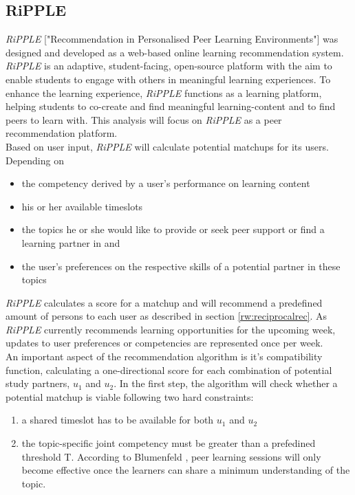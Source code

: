 \documentclass[conference]{IEEEtran}
\begin{document}
\subsection{RiPPLE} \label{paper:RiPPLE}
\textit{RiPPLE} ["Recommendation in Personalised Peer Learning Environments"] was designed and developed as a web-based online learning recommendation system. \textit{RiPPLE} is an adaptive, student-facing, open-source platform with the aim to enable students to engage with others in meaningful learning experiences. To enhance the learning experience, \textit{RiPPLE} functions as a learning platform, helping students to co-create and find meaningful learning-content and to find peers to learn with. This analysis will focus on \textit{RiPPLE} as a peer recommendation platform.\\
Based on user input, \textit{RiPPLE} will calculate potential matchups for its users. Depending on
\begin{itemize}
	\item the competency derived by a user's performance on learning content
	\item his or her available timeslots
	\item the topics he or she would like to provide or seek peer support or find a learning partner in and
	\item the user's preferences on the respective skills of a potential partner in these topics
\end{itemize}
\textit{RiPPLE} calculates a score for a matchup and will recommend a predefined amount of persons to each user as described in section \ref{rw:reciprocalrec}. As \textit{RiPPLE} currently recommends learning opportunities for the upcoming week, updates to user preferences or competencies are represented once per week.\\
An important aspect of the recommendation algorithm is it's compatibility function, calculating a one-directional score for each combination of potential study partners, \(u_1\) and \(u_2\). In the first step, the algorithm will check whether a potential matchup is viable following two hard constraints:
\begin{enumerate}
	\item a shared timeslot has to be available for both \(u_1\) and \(u_2\)
	\item the topic-specific joint competency must be greater than a prefedined threshold T. According to Blumenfeld \cite{blumenfeld1996learning}, peer learning sessions will only become effective once the learners can share a minimum understanding of the topic.
\end{enumerate}
\end{document}
